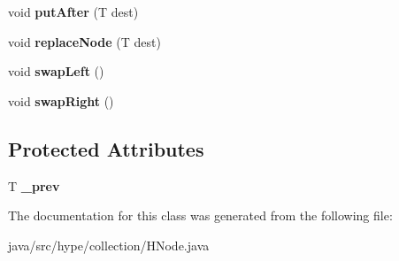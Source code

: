 \begin{DoxyCompactItemize}
\item 
\hypertarget{classhype_1_1collection_1_1_h_node_3_01_t_01extends_01_h_node_3_01_t_01_4_01_4_a08c0acc59fa09953be41220884d6f5a2}{void {\bfseries put\-After} (T dest)}\label{classhype_1_1collection_1_1_h_node_3_01_t_01extends_01_h_node_3_01_t_01_4_01_4_a08c0acc59fa09953be41220884d6f5a2}

\item 
\hypertarget{classhype_1_1collection_1_1_h_node_3_01_t_01extends_01_h_node_3_01_t_01_4_01_4_a187049986a5f455ed4d5fa03b85847dc}{void {\bfseries replace\-Node} (T dest)}\label{classhype_1_1collection_1_1_h_node_3_01_t_01extends_01_h_node_3_01_t_01_4_01_4_a187049986a5f455ed4d5fa03b85847dc}

\item 
\hypertarget{classhype_1_1collection_1_1_h_node_3_01_t_01extends_01_h_node_3_01_t_01_4_01_4_a5dfe63c251a2704908e6bb78f7ed9189}{void {\bfseries swap\-Left} ()}\label{classhype_1_1collection_1_1_h_node_3_01_t_01extends_01_h_node_3_01_t_01_4_01_4_a5dfe63c251a2704908e6bb78f7ed9189}

\item 
\hypertarget{classhype_1_1collection_1_1_h_node_3_01_t_01extends_01_h_node_3_01_t_01_4_01_4_a0e50c91ed5b7f2d4b25544738b616b74}{void {\bfseries swap\-Right} ()}\label{classhype_1_1collection_1_1_h_node_3_01_t_01extends_01_h_node_3_01_t_01_4_01_4_a0e50c91ed5b7f2d4b25544738b616b74}

\end{DoxyCompactItemize}
\subsection*{Protected Attributes}
\begin{DoxyCompactItemize}
\item 
\hypertarget{classhype_1_1collection_1_1_h_node_3_01_t_01extends_01_h_node_3_01_t_01_4_01_4_a7ff9831ba521011990737431a89fcf04}{T {\bfseries \-\_\-prev}}\label{classhype_1_1collection_1_1_h_node_3_01_t_01extends_01_h_node_3_01_t_01_4_01_4_a7ff9831ba521011990737431a89fcf04}

\end{DoxyCompactItemize}


The documentation for this class was generated from the following file\-:\begin{DoxyCompactItemize}
\item 
java/src/hype/collection/H\-Node.\-java\end{DoxyCompactItemize}
